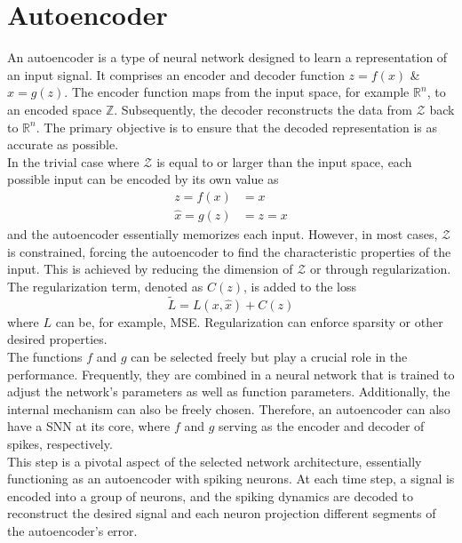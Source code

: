 \section{Autoencoder}
An autoencoder is a type of neural network designed to learn a representation of an input signal. It comprises an encoder and decoder function $z =f(x)$ \& $\hat{x} = g(z)$. The encoder function maps from the input space, for example $\mathbb{R}^n$, to an encoded space $\mathbb{Z}$. Subsequently, the decoder reconstructs the data from $\mathcal{Z}$ back to $\mathbb{R}^n$. The primary objective is to ensure that the decoded representation is as accurate as possible.\\
In the trivial case where $\mathcal{Z}$ is equal to or larger than the input space, each possible input can be encoded by its own value as
\begin{equation}
\begin{aligned}
 	z = f(x) &= x\\
 	\hat{x} = g(z) &= z = x
\end{aligned}
\end{equation}
and the autoencoder essentially memorizes each input. However, in most cases, $\mathcal{Z}$ is constrained, forcing the autoencoder to find the characteristic properties of the input. This is achieved by reducing the dimension of $\mathcal{Z}$ or through regularization. The regularization term, denoted as $C(z)$, is added to the loss
\begin{equation}
	\tilde{L} = L(x,\hat{x}) + C(z)
\end{equation}
where $L$ can be, for example, MSE. Regularization can enforce sparsity or other desired properties\cite{goodfellow_deep_2016}.\\
The functions $f$ and $g$ can be selected freely but play a crucial role in the performance. Frequently, they are combined in a neural network that is trained to adjust the network's parameters as well as function parameters. Additionally, the internal mechanism can also be freely chosen. Therefore, an autoencoder can also have a \ac{SNN} at its core, where $f$ and $g$ serving as the encoder and decoder of spikes, respectively.\\
This step is a pivotal aspect of the selected network architecture, essentially functioning as an autoencoder with spiking neurons. At each time step, a signal is encoded into a group of neurons, and the spiking dynamics are decoded to reconstruct the desired signal and each neuron projection different segments of the autoencoder's error.\\

